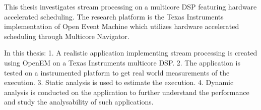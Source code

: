 This thesis investigates stream processing on a multicore DSP featuring hardware accelerated scheduling. The research platform is the Texas Instruments implementation of Open Event Machine which utilizes hardware accelerated scheduling through Multicore Navigator.

In this thesis: 1. A realistic application implementing stream processing is created using OpenEM on a Texas Instruments multicore DSP. 2. The application is tested on a instrumented platform to get real world measurements of the execution. 3. Static analysis is used to estimate the execution. 4. Dynamic analysis is conducted on the application to further understand the performance and study the analysability of such applications.